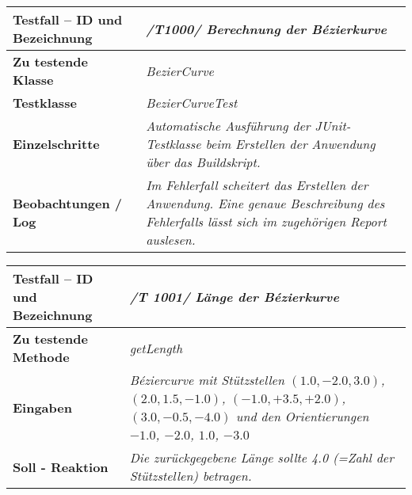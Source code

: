 \begin{longtable}{|p{7cm}|p{10cm}|}
\hline
\textbf{Testfall -- ID und Bezeichnung} &  \textit{/T1000/ Berechnung der Bézierkurve} \\
\hline
\textbf{Zu testende Klasse} &  \textit{BezierCurve} \\
\hline
\textbf{Testklasse} &  \textit{BezierCurveTest} \\
\hline
\textbf{Einzelschritte} &  \textit{Automatische Ausführung der JUnit-Testklasse beim Erstellen
der Anwendung über das Buildskript.} \\
\hline
\textbf{Beobachtungen / Log} &  \textit{Im Fehlerfall scheitert das Erstellen der Anwendung.
Eine genaue Beschreibung des Fehlerfalls lässt sich im zugehörigen Report auslesen.} \\
\hline

\end{longtable}

\begin{longtable}{|p{7cm}|p{10cm}|}
\hline
\textbf{Testfall -- ID und Bezeichnung} & \textit{ /T 1001/ Länge der Bézierkurve} \\
\hline
\textbf{Zu testende Methode} &  \textit{getLength} \\
\hline
\textbf{Eingaben} & \textit{Béziercurve mit Stützstellen $(1.0, -2.0, 3.0)$,
$(2.0, 1.5, -1.0)$, $(-1.0, +3.5, +2.0)$, $(3.0, -0.5, -4.0)$ und
den Orientierungen $-1.0$, $-2.0$, $1.0$, $-3.0$ }\\
\hline
\textbf{Soll - Reaktion} & \textit{Die zurückgegebene Länge sollte 4.0 (=Zahl der Stützstellen)
betragen.} \\
\hline
\end{longtable}